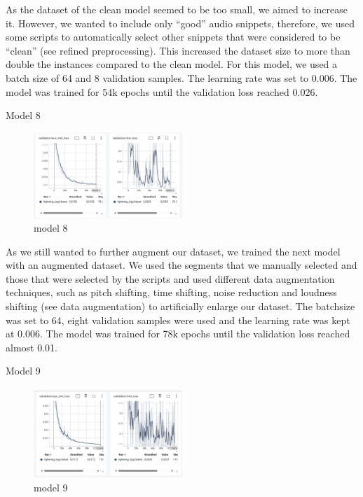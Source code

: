 \documentclass[a4paper]{article}
\begin{document}
As the dataset of the clean model seemed to be too small, we aimed to increase it. However, we wanted to include only “good” audio snippets, therefore, we used some scripts to automatically select other snippets that were considered to be “clean” (see refined preprocessing). This increased the dataset size to more than double the instances compared to the clean model. For this model, we used a batch size of 64 and 8 validation samples. The learning rate was set to 0.006. The model was trained for 54k epochs until the validation loss reached 0.026.

Model 8

\begin{figure}[htbp]
    \centering
    \includegraphics[width=0.5\textwidth]{graphics/v8_testing.png}
    \caption{model 8}
    \label{fig:bild5}
\end{figure}

As we still wanted to further augment our dataset, we trained the next model with an augmented dataset. We used the segments that we manually selected and those that were selected by the scripts and used different data augmentation techniques, such as pitch shifting, time shifting, noise reduction and loudness shifting (see data augmentation) to artificially enlarge our dataset. The batchsize was set to 64, eight validation samples were used and the learning rate was kept at 0.006. The model was trained for 78k epochs until the validation loss reached almost 0.01.


Model 9

\begin{figure}[htbp]
    \centering
    \includegraphics[width=0.5\textwidth]{graphics/v9_testing.png}
    \caption{model 9}
    \label{fig:bild5}
\end{figure}
\end{document}
